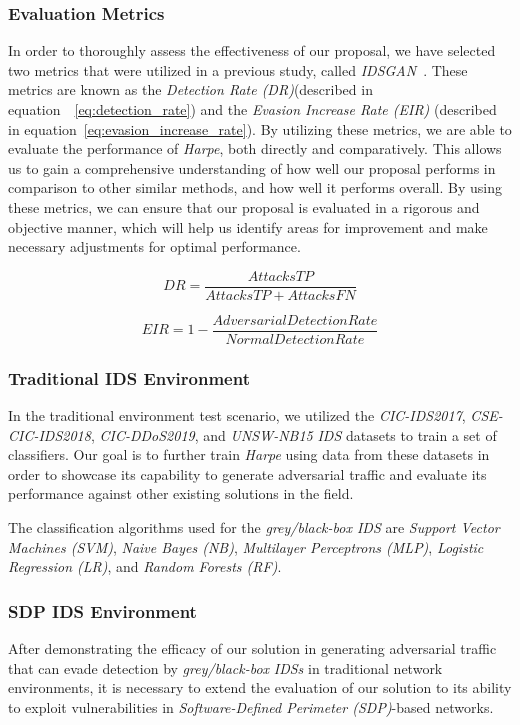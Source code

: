 \subsubsection{Evaluation Metrics}
In order to thoroughly assess the effectiveness of our proposal, we have selected two metrics that were utilized in a
previous study, called \textit{IDSGAN}~\cite{lin2022idsgan}.
These metrics are known as the \textit{Detection Rate (DR)}(described in equation~~\ref{eq:detection_rate}) and the
\textit{Evasion Increase Rate (EIR)} (described in equation~\ref{eq:evasion_increase_rate}).
By utilizing these metrics, we are able to evaluate the performance of \textit{Harpe}, both directly and comparatively.
This allows us to gain a comprehensive understanding of how well our proposal performs in comparison to other similar
methods, and how well it performs overall.
By using these metrics, we can ensure that our proposal is evaluated in a rigorous and objective manner, which will
help us identify areas for improvement and make necessary adjustments for optimal performance.

\begin{equation}
    \label{eq:detection_rate}
    DR = \frac{Attacks TP}{Attacks TP + Attacks FN}
\end{equation}

\begin{equation}
    \label{eq:evasion_increase_rate}
    EIR = 1 - \frac{Adversarial Detection Rate}{Normal Detection Rate}
\end{equation}

\subsubsection{Traditional IDS Environment}
In the traditional environment test scenario, we utilized the \textit{CIC-IDS2017}, \textit{CSE-CIC-IDS2018},
\textit{CIC-DDoS2019}, and \textit{UNSW-NB15} \textit{IDS} datasets to train a set of classifiers.
Our goal is to further train \textit{Harpe} using data from these datasets in order to showcase its capability to
generate adversarial traffic and evaluate its performance against other existing solutions in the field.

The classification algorithms used for the \textit{grey/black-box IDS} are \textit{Support Vector Machines (SVM)},
\textit{Naive Bayes (NB)}, \textit{Multilayer Perceptrons (MLP)}, \textit{Logistic Regression (LR)}, and
\textit{Random Forests (RF)}.

\subsubsection{SDP IDS Environment}
After demonstrating the efficacy of our solution in generating adversarial traffic that can evade detection by
\textit{grey/black-box} \textit{IDSs} in traditional network environments, it is necessary to extend the evaluation of
our solution to its ability to exploit vulnerabilities in \textit{Software-Defined Perimeter (SDP)}-based networks.

